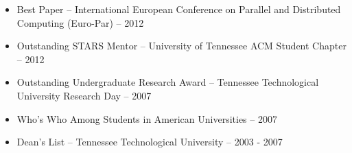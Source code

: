 \begin{itemize}
    \item Best Paper -- International European Conference on Parallel and Distributed Computing (Euro-Par) -- 2012
    \item Outstanding STARS Mentor -- University of Tennessee ACM Student Chapter -- 2012
    \item Outstanding Undergraduate Research Award -- Tennessee Technological University Research Day -- 2007
    \item Who's Who Among Students in American Universities -- 2007
    \item Dean's List -- Tennessee Technological University -- 2003 - 2007
\end{itemize}
